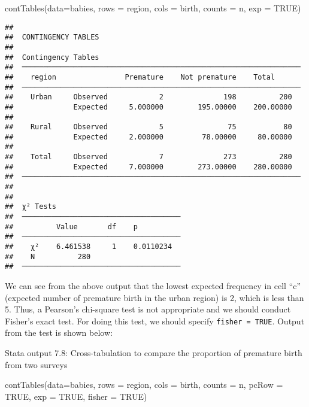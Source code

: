 \documentclass[
]{memoir}
\newenvironment{Shaded}{\begin{snugshade}}{\end{snugshade}}
\newcommand{\AttributeTok}[1]{\textcolor[rgb]{0.77,0.63,0.00}{#1}}
\newcommand{\ConstantTok}[1]{\textcolor[rgb]{0.00,0.00,0.00}{#1}}
\newcommand{\FunctionTok}[1]{\textcolor[rgb]{0.00,0.00,0.00}{#1}}
\newcommand{\NormalTok}[1]{#1}
\begin{document}
\begin{Shaded}
\begin{Highlighting}[]
\FunctionTok{contTables}\NormalTok{(}\AttributeTok{data=}\NormalTok{babies,}
           \AttributeTok{rows =}\NormalTok{ region, }\AttributeTok{cols =}\NormalTok{ birth, }\AttributeTok{counts =}\NormalTok{ n,}
           \AttributeTok{exp =} \ConstantTok{TRUE}\NormalTok{)}
\end{Highlighting}
\end{Shaded}

\begin{verbatim}
## 
##  CONTINGENCY TABLES
## 
##  Contingency Tables                                                
##  ───────────────────────────────────────────────────────────────── 
##    region                Premature    Not premature    Total       
##  ───────────────────────────────────────────────────────────────── 
##    Urban     Observed            2              198          200   
##              Expected     5.000000        195.00000    200.00000   
##                                                                    
##    Rural     Observed            5               75           80   
##              Expected     2.000000         78.00000     80.00000   
##                                                                    
##    Total     Observed            7              273          280   
##              Expected     7.000000        273.00000    280.00000   
##  ───────────────────────────────────────────────────────────────── 
## 
## 
##  χ² Tests                              
##  ───────────────────────────────────── 
##          Value       df    p           
##  ───────────────────────────────────── 
##    χ²    6.461538     1    0.0110234   
##    N          280                      
##  ─────────────────────────────────────
\end{verbatim}

We can see from the above output that the lowest expected frequency in cell ``c'' (expected number of premature birth in the urban region) is 2, which is less than 5. Thus, a Pearson's chi-square test is not appropriate and we should conduct Fisher's exact test. For doing this test, we should specify \texttt{fisher\ =\ TRUE}. Output from the test is shown below:

Stata output 7.8: Cross-tabulation to compare the proportion of premature birth from two surveys

\begin{Shaded}
\begin{Highlighting}[]
\FunctionTok{contTables}\NormalTok{(}\AttributeTok{data=}\NormalTok{babies,}
           \AttributeTok{rows =}\NormalTok{ region, }\AttributeTok{cols =}\NormalTok{ birth, }\AttributeTok{counts =}\NormalTok{ n,}
           \AttributeTok{pcRow =} \ConstantTok{TRUE}\NormalTok{, }\AttributeTok{exp =} \ConstantTok{TRUE}\NormalTok{, }\AttributeTok{fisher =} \ConstantTok{TRUE}\NormalTok{)}
\end{Highlighting}
\end{Shaded}
\end{document}
